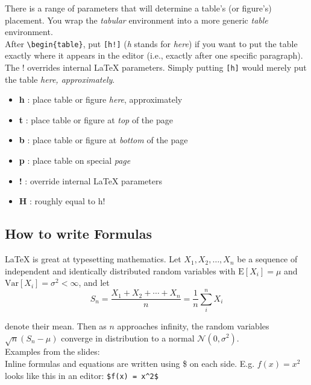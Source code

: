 \documentclass{article}
\begin{document}
There is a range of parameters that will determine a table's (or figure's) placement. You wrap the \textit{tabular} environment into a more generic \textit{table} environment.\\
After \verb|\begin{table}|, put \verb|[h!]| (\textit{h} stands for \textit{here}) if you want to put the table exactly where it appears in the editor (i.e., exactly after one specific paragraph).\\
The ! overrides internal LaTeX parameters. Simply putting \verb|[h]| would merely put the table \textit{here, approximately}. 

\begin{itemize}
    \item \textbf{h} : place table or figure \textit{here}, approximately
    \item \textbf{t} : place table or figure at \textit{top} of the page
    \item \textbf{b} : place table or figure at \textit{bottom} of the page
    \item \textbf{p} : place table on special \textit{page}
    \item \textbf{!} : override internal LaTeX parameters
    \item \textbf{H} : roughly equal to h!
\end{itemize} 



\subsection{How to write Formulas}

\LaTeX{} is great at typesetting mathematics. Let $X_1, X_2, \ldots, X_n$ be a sequence of independent and identically distributed random variables with $\text{E}[X_i] = \mu$ and $\text{Var}[X_i] = \sigma^2 < \infty$, and let
\begin{equation*}
S_n = \frac{X_1 + X_2 + \cdots + X_n}{n}
      = \frac{1}{n}\sum_{i}^{n} X_i    
\end{equation*}

denote their mean. Then as $n$ approaches infinity, the random variables $\sqrt{n}(S_n - \mu)$ converge in distribution to a normal $\mathcal{N}(0, \sigma^2)$.\\

Examples from the slides:\\

Inline formulas and equations are written using \$ on each side.
E.g. $f(x) = x^2$ looks like this in an editor: \verb|$f(x) = x^2$|
\end{document}
